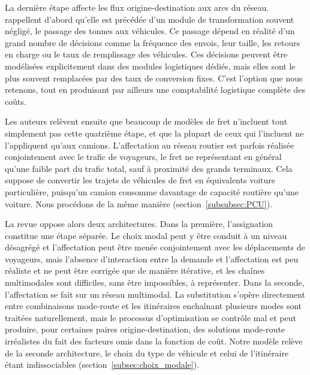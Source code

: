 \documentclass[12pt,a4paper,french]{report}
\begin{document}
	La dernière étape affecte les flux origine-destination aux arcs du réseau. \cite{deJong2004} rappellent d'abord qu'elle est précédée d'un module de transformation souvent négligé, le passage des tonnes aux véhicules. Ce passage dépend en réalité d'un grand nombre de décisions comme la fréquence des envois, leur taille, les retours en charge ou le taux de remplissage des véhicules. Ces décisions peuvent être modélisées explicitement dans des modules logistiques dédiés, mais elles sont le plus souvent remplacées par des taux de conversion fixes. C'est l'option que nous retenons, tout en produisant par ailleurs une comptabilité logistique complète des coûts.

	Les auteurs relèvent ensuite que beaucoup de modèles de fret n'incluent tout simplement pas cette quatrième étape, et que la plupart de ceux qui l'incluent ne l'appliquent qu'aux camions. L'affectation au réseau routier est parfois réalisée conjointement avec le trafic de voyageurs, le fret ne représentant en général qu'une faible part du trafic total, sauf à proximité des grands terminaux. Cela suppose de convertir les trajets de véhicules de fret en équivalents voiture particulière, puisqu'un camion consomme davantage de capacité routière qu'une voiture. Nous procédons de la même manière (section~\ref{subsubsec:PCU}).

	La revue oppose alors deux architectures. Dans la première, l'assignation constitue une étape séparée. Le choix modal peut y être conduit à un niveau désagrégé et l'affectation peut être menée conjointement avec les déplacements de voyageurs, mais l'absence d'interaction entre la demande et l'affectation est peu réaliste et ne peut être corrigée que de manière itérative, et les chaînes multimodales sont difficiles, sans être impossibles, à représenter. Dans la seconde, l'affectation se fait sur un réseau multimodal. La substitution s'opère directement entre combinaisons mode-route et les itinéraires enchaînant plusieurs modes sont traitées naturellement, mais le processus d'optimisation se contrôle mal et peut produire, pour certaines paires origine-destination, des solutions mode-route irréalistes du fait des facteurs omis dans la fonction de coût. Notre modèle relève de la seconde architecture, le choix du type de véhicule et celui de l'itinéraire étant indissociables (section~\ref{subsec:choix_modale}).
\end{document}
